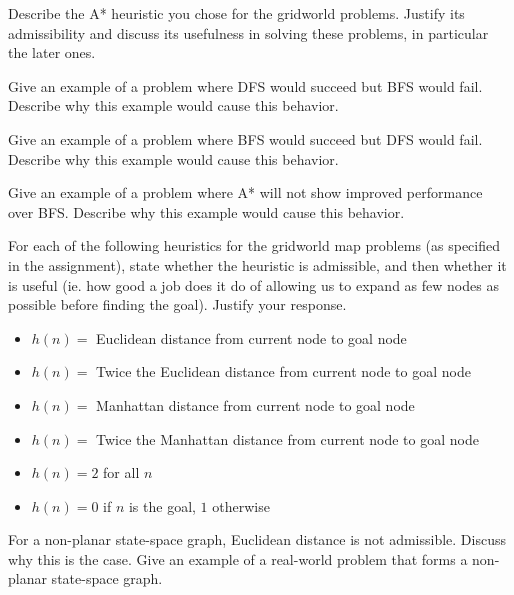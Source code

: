 \documentclass[12pt]{article}
\newenvironment{questionList}{
\newcounter{ctr}
\begin{list}{\textbf{Question \arabic{ctr}.} \\ \\ }
  {\usecounter{ctr}}
  }{
\end{list}
}
\begin{document}
\begin{questionList}
\item Describe the A* heuristic you chose for the gridworld problems.  Justify its
admissibility and discuss its usefulness in solving these problems, in
particular the later ones.

\item Give an example of a problem where DFS would succeed but BFS would fail.
Describe why this example would cause this behavior.

\item Give an example of a problem where BFS would succeed but DFS would fail.
Describe why this example would cause this behavior.

\item Give an example of a problem where A* will not show improved performance
over BFS.  Describe why this example would cause this behavior.

\item For each of the following heuristics for the gridworld map problems (as
specified in the assignment), state whether the heuristic is admissible, and
then whether it is useful (ie. how good a job does it do of allowing us to
expand as few nodes as possible before finding the goal).  Justify your response. 
\begin{itemize}
  \item $h(n)= $ Euclidean distance from current node to goal node
  \item $h(n)= $ Twice the Euclidean distance from current node to goal node
  \item $h(n)= $ Manhattan distance from current node to goal node
  \item $h(n)= $ Twice the Manhattan distance from current node to goal node
  \item $h(n)= 2$ for all $n$
  \item $h(n)= 0$ if $n$ is the goal, $1$ otherwise
\end{itemize}

\item For a non-planar state-space graph, Euclidean distance is not admissible.
Discuss why this is the case.  Give an example of a real-world problem that
forms a non-planar state-space graph.

\end{questionList}
\end{document}
